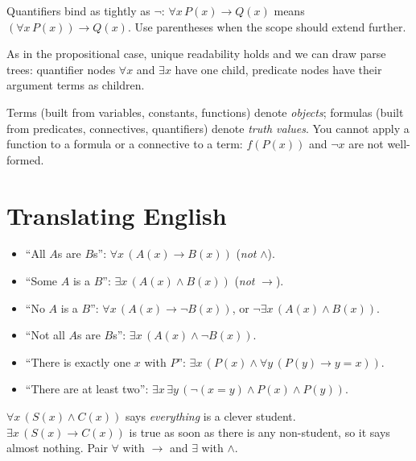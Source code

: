 Quantifiers bind as tightly as $\neg$: $\forall x\,P(x)\to Q(x)$ means
$(\forall x\,P(x))\to Q(x)$. Use parentheses when the scope should extend further.

As in the propositional case, unique readability holds and we can draw parse trees:
quantifier nodes $\forall x$ and $\exists x$ have one child, predicate nodes have their
argument terms as children.

\begin{important}
Terms (built from variables, constants, functions) denote \emph{objects}; formulas (built
from predicates, connectives, quantifiers) denote \emph{truth values}. You cannot apply a
function to a formula or a connective to a term: $f(P(x))$ and $\neg x$ are not
well-formed.
\end{important}

\section{Translating English}

\begin{itemize}
  \item ``All $A$s are $B$s'': $\forall x\,(A(x)\to B(x))$ \quad(\emph{not} $\land$).
  \item ``Some $A$ is a $B$'': $\exists x\,(A(x)\land B(x))$ \quad(\emph{not} $\to$).
  \item ``No $A$ is a $B$'': $\forall x\,(A(x)\to\neg B(x))$, or
        $\neg\exists x\,(A(x)\land B(x))$.
  \item ``Not all $A$s are $B$s'': $\exists x\,(A(x)\land\neg B(x))$.
  \item ``There is exactly one $x$ with $P$'':
        $\exists x\,(P(x)\land\forall y\,(P(y)\to y=x))$.
  \item ``There are at least two'': $\exists x\,\exists y\,(\neg(x=y)\land P(x)\land P(y))$.
\end{itemize}

\begin{important}
$\forall x\,(S(x)\land C(x))$ says \emph{everything} is a clever student.
$\exists x\,(S(x)\to C(x))$ is true as soon as there is any non-student, so it says
almost nothing. Pair $\forall$ with $\to$ and $\exists$ with $\land$.
\end{important}

